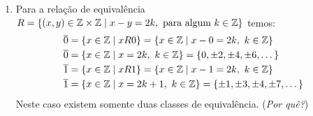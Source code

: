 \begin{exemplos}
\begin{enumerate}[label={\arabic*})]
        \item Para a rela\c{c}\~ao de equival\^encia $R = \{(x,y)\in \mathbb{Z} \times \mathbb{Z} \mid x - y = 2k, \mbox{ para algum } k \in \mathbb{Z}\}$ temos:
        \begin{align*}
            \overline{0} &= \{x \in \mathbb{Z} \mid xR0 \} = \{x \in \mathbb{Z} \mid x - 0 = 2k,\ k \in \mathbb{Z}\} \\
            \overline{0} &= \{x \in \mathbb{Z} \mid x = 2k,\ k \in \mathbb{Z}\} = \{0, \pm 2, \pm 4, \pm 6, \dots\}\\
            \overline{1} &= \{x \in \mathbb{Z} \mid xR1 \} = \{x \in \mathbb{Z} \mid x - 1 = 2k,\ k \in \mathbb{Z}\} \\
            \overline{1} &= \{x \in \mathbb{Z} \mid x = 2k + 1,\ k \in \mathbb{Z}\} = \{\pm 1, \pm 3, \pm 4, \pm 7, \dots\}\\
        \end{align*}
        Neste caso existem somente duas classes de equival\^encia. (\textit{Por qu\^e?})
    \end{enumerate}
\end{exemplos}


